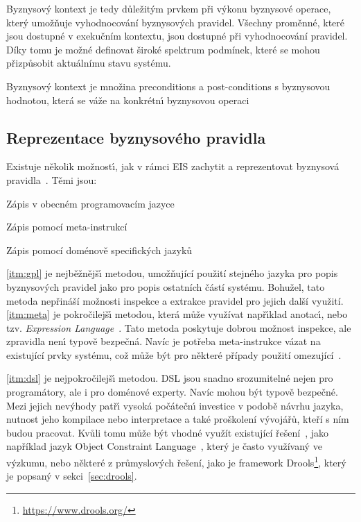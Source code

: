 Byznysový kontext je tedy důležitým prvkem při výkonu byznysové operace, který umožňuje vyhodnocování byznysových pravidel.
Všechny proměnné, které jsou dostupné v exekučním kontextu, jsou dostupné při vyhodnocování pravidel. Díky tomu je možné
definovat široké spektrum podmínek, které se mohou přizpůsobit aktuálnímu stavu systému.

\begin{definition}
    Byznysový kontext je množina preconditions a post-conditions s byznysovou hodnotou, která se váže na
    konkrétn\'{\i} byznysovou operaci~\cite{cemus2015automated}
\end{definition}

\subsection{Reprezentace byznysového pravidla}\label{sec:business-rule-representation}

Existuje několik možnost\'{\i}, jak v rámci \gls{EIS} zachytit a reprezentovat byznysová
pravidla~\cite{cemus2015automated}. Těmi jsou:

\benum[label=\circledAlph]
    \item\label{itm:gpl} Zápis v obecném programovacím jazyce
    \item\label{itm:meta} Zápis pomocí meta-instrukcí
    \item\label{itm:dsl} Zápis pomocí doménově specifických jazyků
\eenum

\ref{itm:gpl} je nejběžnějš\'{\i} metodou, umožňující použití stejného jazyka pro popis byznysových pravidel jako
pro popis ostatních částí systému. Bohužel, tato metoda nepřináší možnosti inspekce a extrakce pravidel pro jejich další využití.
\ref{itm:meta} je pokročilejš\'{\i} metodou, která může využívat např\'{\i}klad anotac\'{\i}, nebo tzv. \textit{Expression
Language}~\cite{nemuraite2008representation}. Tato metoda poskytuje dobrou možnost inspekce, ale zpravidla nen\'{\i} typově bezpečná.
Navíc je potřeba meta-instrukce vázat na existující prvky systému, což může být pro některé případy použití omezující~\cite{cemus2015automated}.

\ref{itm:dsl} je nejpokročilejš\'{\i} metodou. \gls{DSL} jsou snadno srozumitelné nejen pro programátory, ale i pro doménové experty.
Navíc mohou b\'yt typově bezpečné. Mezi jejich nev\'yhody patř\'{\i} vysoká počátečn\'{\i} investice v podobě návrhu jazyka, nutnost
jeho kompilace nebo interpretace a také proškolení vývojářů, kteří s ním budou pracovat. Kvůli tomu může být vhodné využít
existující řešení~\cite{cemus2015automated}, jako například jazyk Object Constraint Language~\cite{warmer1998object},
který je často využívaný ve výzkumu, nebo některé z průmyslových řešení, jako je framework Drools\footnote{\url{https://www.drools.org/}},
který je popsaný v sekci~\ref{sec:drools}.

